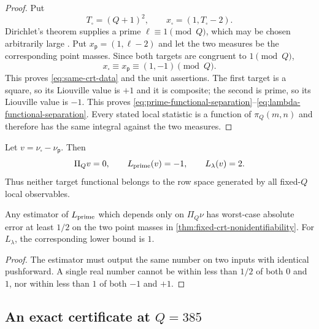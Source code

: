 \begin{proof}
Put
\[
 T_\square=(Q+1)^2,
 \qquad
 x_\square=(1,T_\square-2).
\]
Dirichlet's theorem supplies a prime $\ell\equiv1\pmod Q$, which may be
chosen arbitrarily large \cite[Chapter~6]{MontgomeryVaughan2007}.  Put
$x_{\mathsf p}=(1,\ell-2)$ and let the two
measures be the corresponding point masses.  Since both targets are
congruent to $1\pmod Q$,
\[
 x_\square\equiv x_{\mathsf p}\equiv(1,-1)\pmod Q.
\]
This proves \eqref{eq:same-crt-data} and the unit assertions.  The first
target is a square, so its Liouville value is $+1$ and it is composite; the
second is prime, so its Liouville value is $-1$.  This proves
\eqref{eq:prime-functional-separation}--\eqref{eq:lambda-functional-separation}.
Every stated local statistic is a function of $\pi_Q(m,n)$ and therefore has
the same integral against the two measures.
\end{proof}

Let $v=\nu_\square-\nu_{\mathsf p}$.  Then
\begin{equation}\label{eq:nullspace-witness}
 \Pi_Qv=0,
 \qquad
 L_{\rm prime}(v)=-1,
 \qquad
 L_\lambda(v)=2.
\end{equation}
Thus neither target functional belongs to the row space generated by all
fixed-$Q$ local observables.

\begin{corollary}\label{cor:minimax-local-estimator}
Any estimator of $L_{\rm prime}$ which depends only on $\Pi_Q\nu$ has
worst-case absolute error at least $1/2$ on the two point masses in
\cref{thm:fixed-crt-nonidentifiability}.  For $L_\lambda$, the corresponding
lower bound is $1$.
\end{corollary}

\begin{proof}
The estimator must output the same number on two inputs with identical
pushforward.  A single real number cannot be within less than $1/2$ of both
$0$ and $1$, nor within less than $1$ of both $-1$ and $+1$.
\end{proof}

\subsection{An exact certificate at \texorpdfstring{$Q=385$}{Q=385}}

